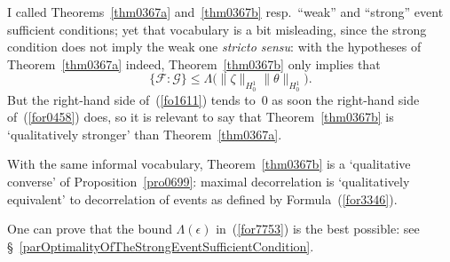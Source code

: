 \begin{Rmk}
I called Theorems~\ref{thm0367a} and~\ref{thm0367b}
resp.\ ``weak'' and ``strong'' event sufficient conditions;
yet that vocabulary is a bit misleading,
since the strong condition does not imply the weak one \emph{stricto sensu}:
with the hypotheses of Theorem~\ref{thm0367a} indeed,
Theorem~\ref{thm0367b} only implies that
\[\label{fo1611} \{\mathcal{F}:\mathcal{G}\} \leq \Lambda\big(\|\zeta\|_{H^1_0}\|\theta\|_{H^1_0}\big) .\]
But the right-hand side of~(\ref{fo1611}) tends to~$0$
as soon the right-hand side of~(\ref{for0458}) does,
so it is relevant to say that Theorem~\ref{thm0367b} is `qualitatively stronger'
than Theorem~\ref{thm0367a}.
\end{Rmk}

\begin{Rmk}
With the same informal vocabulary,
Theorem~\ref{thm0367b} is a `qualitative converse' of Proposition~\ref{pro0699}:
maximal decorrelation is `qualitatively equivalent' to decorrelation of events
as defined by Formula~(\ref{for3346}).
\end{Rmk}

\begin{Rmk}
One can prove that the bound $\Lambda(\epsilon)$
in~(\ref{for7753}) is the best possible:
see \S~\ref{parOptimalityOfTheStrongEventSufficientCondition}.
\end{Rmk}

